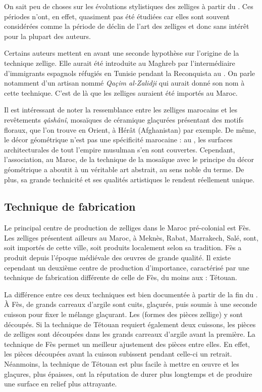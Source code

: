 On sait peu de choses sur les évolutions stylistiques des zelliges 
à partir du . Ces périodes n'ont, en effet, quasiment
pas été étudiées car elles sont souvent considérées comme la période 
de déclin de l'art des zelliges et donc sans intérêt pour la plupart 
des auteurs.

Certains auteurs \autocite{Castera_1996, Soustiel_1985} mettent en 
avant une seconde hypothèse sur l'origine de la technique zellige. 
Elle aurait été introduite au Maghreb par l'intermédiaire 
d'immigrants espagnols réfugiés en Tunisie pendant la Reconquista 
au . On parle notamment d'un artisan nommé \emph{Qaçim
al-Zalidji} qui aurait donné son nom à cette technique. C'est de là 
que les zelliges auraient été importés au Maroc.

Il est intéressant de noter la ressemblance entre les zelliges 
marocains et les revêtements \emph{qâshânî}, mosaïques de céramique 
glaçurées présentant des motifs floraux, que l'on trouve en Orient, 
à Hérât (Afghanistan) par exemple. De même, le décor géométrique 
n'est pas une spécificité marocaine : au , les surfaces 
architecturales de tout l'empire musulman s'en sont couvertes. 
Cependant, l'association, au Maroc, de la technique de la mosaïque 
avec le principe du décor géométrique a aboutit à un véritable art 
abstrait, au sens noble du terme. De plus, sa grande technicité et 
ses qualités artistiques le rendent réellement unique.

\subsection{Technique de fabrication}
Le principal centre de production de zelliges dans le Maroc 
pré-colonial est Fès. Les zelliges présentent ailleurs au Maroc, 
à Meknès, Rabat, Marrakech, Salé, sont, soit importés de cette ville, 
soit produits localement selon sa tradition. Fès a produit depuis 
l'époque médiévale des {\oe}uvres de grande qualité. Il existe 
cependant un deuxième centre de production d'importance, caractérisé 
par une technique de fabrication différente de celle de Fès, du moins 
aux  : Tétouan.

La différence entre ces deux techniques est bien documentée à partir 
de la fin du . À Fès, de grands carreaux d'argile sont 
cuits, glaçurés, puis soumis à une seconde cuisson pour fixer le 
mélange glaçurant. Les \furmas (formes des pièces zellige) 
y sont découpés. Si la technique de Tétouan requiert également deux 
cuissons, les pièces de zelliges sont découpées dans les grands 
carreaux d'argile avant la première. La technique de Fès permet un 
meilleur ajustement des pièces entre elles. En effet, les pièces 
découpées avant la cuisson subissent pendant celle-ci un retrait. 
Néanmoins, la technique de Tétouan est plus facile à mettre en 
{\oe}uvre et les glaçures, plus épaisses, ont la réputation de durer 
plus longtemps et de produire une surface en relief plus attrayante.

